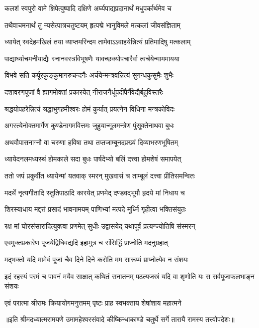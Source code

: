\twolineshloka
{कलशं स्वपुरो वामे क्षिपेत्पुष्पादि दक्षिणे}
{अर्घ्यपाद्यप्रदानार्थं मधुपर्कार्थमेव च} %

\twolineshloka
{तथैवाचमनार्थं तु न्यसेत्पात्रचतुष्टयम्}
{हृत्पद्मे भानुविमले मत्कलां जीवसंज्ञिताम्} %

\twolineshloka
{ध्यायेत् स्वदेहमखिलं तया व्याप्तमरिन्दम}
{तामेवाऽऽवाहयेन्नित्यं प्रतिमादिषु मत्कलाम्} %

\twolineshloka
{पाद्यार्घ्याचमनीयाद्यैः स्नानवस्त्रविभूषणैः}
{यावच्छक्योपचारैर्वा त्वर्चयेन्माममायया} %

\twolineshloka
{विभवे सति कर्पूरकुङ्कुमागरुचन्दनैः}
{अर्चयेन्मन्त्रवन्नित्यं सुगन्धकुसुमैः शुभैः} %

\twolineshloka
{दशावरणपूजां वै ह्यागमोक्तां प्रकारयेत्}
{नीराजनैर्धूपदीपैर्नैवेद्यैर्बहुविस्तरैः} %

\twolineshloka
{श्रद्धयोपहरेन्नित्यं श्रद्धाभुगहमीश्वरः}
{होमं कुर्यात् प्रयत्नेन विधिना मन्त्रकोविदः} %

\twolineshloka
{अगस्त्येनोक्तमार्गेण कुण्डेनागमवित्तमः}
{जुहुयान्मूलमन्त्रेण पुंसूक्तेनाथवा बुधः} %

\twolineshloka
{अथवौपासनाग्नौ वा चरुणा हविषा तथा}
{तप्तजाम्बूनदप्रख्यं दिव्याभरणभूषितम्} %

\twolineshloka
{ध्यायेदनलमध्यस्थं होमकाले सदा बुधः}
{पार्षदेभ्यो बलिं दत्त्वा होमशेषं समापयेत्} %

\twolineshloka
{ततो जपं प्रकुर्वीत ध्यायेन्मां यतवाक् स्मरन्}
{मुखवासं च ताम्बूलं दत्त्वा प्रीतिसमन्वितः} %

\twolineshloka
{मदर्थे नृत्यगीतादि स्तुतिपाठादि कारयेत्}
{प्रणमेद् दण्डवद्भूमौ हृदये मां निधाय च} %

\twolineshloka
{शिरस्याधाय मद्दत्तं प्रसादं भावनामयम्}
{पाणिभ्यां मत्पदे मूर्ध्नि गृहीत्वा भक्तिसंयुतः} %

\twolineshloka
{रक्ष मां घोरसंसारादित्युक्त्वा प्रणमेत् सुधीः}
{उद्वासयेद् यथापूर्वं प्रत्यग्ज्योतिषि संस्मरन्} %

\twolineshloka
{एवमुक्तप्रकारेण पूजयेद्विधिवद्यदि}
{इहामुत्र च संसिद्धिं प्राप्नोति मदनुग्रहात्} %

\twolineshloka
{मद्भक्तो यदि मामेवं पूजां चैव दिने दिने}
{करोति मम सारूप्यं प्राप्नोत्येव न संशयः} %

\fourlineindentedshloka
{इदं रहस्यं परमं च पावनं}
{मयैव साक्षात् कथितं सनातनम्}
{पठत्यजस्रं यदि वा शृणोति यः}
{स सर्वपूजाफलभाङ्न संशयः} %

\twolineshloka
{एवं परात्मा श्रीरामः क्रियायोगमनुत्तमम्}
{पृष्टः प्राह स्वभक्ताय शेषांशाय महात्मने} %



{॥इति श्रीमदध्यात्मरामयणे उमामहेश्वरसंवादे
कीष्किन्धाकाण्डे चतुर्थे सर्गे  तारायै  रामस्य  तत्त्वोपदेशः॥}
